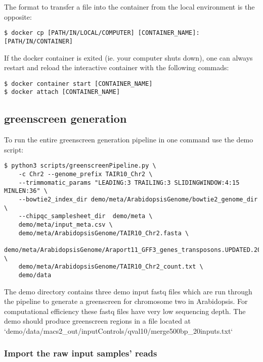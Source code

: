 \documentclass{article}
\begin{document}
\begin{sloppypar}
The format to transfer a file into the container from the local environment is the opposite:

\begin{verbatim}
$ docker cp [PATH/IN/LOCAL/COMPUTER] [CONTAINER_NAME]:[PATH/IN/CONTAINER] 
\end{verbatim}

If the docker container is exited (ie. your computer shuts down), one can always restart and reload the interactive container with the following commads:

\begin{verbatim}
$ docker container start [CONTAINER_NAME]
$ docker attach [CONTAINER_NAME] 
\end{verbatim}

\subsection{greenscreen generation}

To run the entire greenscreen generation pipeline in one command use the demo script:

\begin{verbatim}
$ python3 scripts/greenscreenPipeline.py \
    -c Chr2 --genome_prefix TAIR10_Chr2 \
    --trimmomatic_params "LEADING:3 TRAILING:3 SLIDINGWINDOW:4:15 MINLEN:36" \
    --bowtie2_index_dir demo/meta/ArabidopsisGenome/bowtie2_genome_dir \
    --chipqc_samplesheet_dir  demo/meta \
    demo/meta/input_meta.csv \
    demo/meta/ArabidopsisGenome/TAIR10_Chr2.fasta \
    demo/meta/ArabidopsisGenome/Araport11_GFF3_genes_transposons.UPDATED.201606.Chr2.gff \
    demo/meta/ArabidopsisGenome/TAIR10_Chr2_count.txt \
    demo/data
\end{verbatim}

The demo directory contains three demo input fastq files which are run through the pipeline to generate a greenscreen for chromosome two in Arabidopsis. For computational efficiency these fastq files have very low sequencing depth. The demo should produce greenscreen regions in a file located at `demo/data/macs2\_out/inputControls/qval10/merge500bp\_20inputs.txt`

\subsubsection{Import the raw input samples' reads}


\end{sloppypar}
\end{document}
